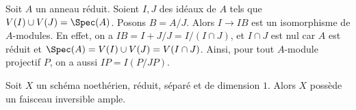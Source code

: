 \begin{remark}
\label{remark-conductor}
Soit $A$ un anneau réduit. Soient $I, J$ des idéaux de $A$
tels que $V(I) \cup V(J) = \Spec(A)$. Posons $B = A/J$.
Alors $I \to IB$ est un isomorphisme de $A$-modules. En effet, on
a $IB = I + J/J = I/(I \cap J)$, et $I \cap J$ est nul car
$A$ est réduit et $\Spec(A) = V(I) \cup V(J) = V(I \cap J)$.
Ainsi, pour tout $A$-module projectif $P$, on a aussi $IP = I(P/JP)$.
\end{remark}

\begin{lemma}
\label{lemma-dim-1-noetherian-reduced-separated-has-ample}
Soit $X$ un schéma noethérien, réduit, séparé et de dimension $1$.
Alors $X$ possède un faisceau inversible ample.
\end{lemma}

